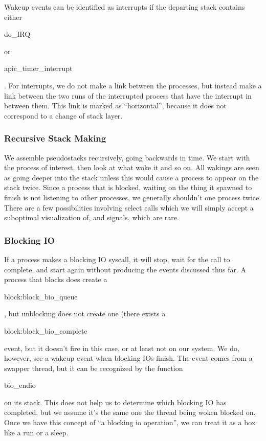 \documentclass{article}
\begin{document}
Wakeup events can be identified as interrupts if the departing stack contains either \begin{tt}do\_IRQ\end{tt} or\\ \begin{tt}apic\_timer\_interrupt\end{tt}.  For interrupts, we do not make a link between the processes, but instead make a link between the two runs of the interrupted process that have the interrupt in between them.  This link is marked as ``horizontal'', because it does not correspond to a change of stack layer.

\subsubsection{Recursive Stack Making}

We assemble pseudostacks recursively, going backwards in time.  We start with the process of interest, then look at what woke it and so on.  All wakings are seen as going deeper into the stack unless this would cause a process to appear on the stack twice.  Since a process that is blocked, waiting on the thing it spawned to finish is not listening to other processes, we generally shouldn't one process twice.  There are a few possibilities involving select calls which we will simply accept a suboptimal visualization of, and signals, which are rare.

\subsubsection{Blocking IO}

If a process makes a blocking IO syscall, it will stop, wait for the call to complete, and start again without producing the events discussed thus far.  A process that blocks does create a \begin{tt}block:block\_bio\_queue\end{tt}, but unblocking does not create one (there exists a \begin{tt}block:block\_bio\_complete\end{tt} event, but it doesn't fire in this case, or at least not on our system.  We do, however, see a wakeup event when blocking IOs finish.  The event comes from a swapper thread, but it can be recognized by the function \begin{tt}bio\_endio\end{tt} on its stack.  This does not help us to determine which blocking IO has completed, but we assume it's the same one the thread being woken blocked on.  Once we have this concept of ``a blocking io operation'', we can treat it as a box like a run or a sleep.
\end{document}
